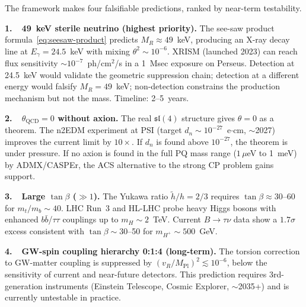 \documentclass[11pt,a4paper]{article}
\theoremstyle{plain}
\theoremstyle{definition}
\theoremstyle{remark}
\begin{document}
The framework makes four falsifiable predictions, ranked by near-term
testability.

\textbf{1.\ \ 49~keV sterile neutrino (highest priority).}
The see-saw product formula~\eqref{eq:seesaw-product} predicts
$M_R \approx 49$~keV, producing an X-ray decay line at $E_\gamma = 24.5$~keV
with mixing $\theta^2 \sim 10^{-6}$.
XRISM (launched 2023) can reach flux sensitivity $\sim 10^{-7}$~ph/cm$^2$/s
in a 1~Msec exposure on Perseus.
Detection at 24.5~keV would validate the geometric suppression chain;
detection at a different energy would falsify $M_R = 49$~keV;
non-detection constrains the production mechanism but not the mass.
Timeline: 2--5~years.

\textbf{2.\ \ $\theta_{\mathrm{QCD}} = 0$ without axion.}
The real $\mathfrak{sl}(4)$ structure gives $\theta = 0$ as a theorem.
The n2EDM experiment at PSI (target $d_n \sim 10^{-27}$~e$\cdot$cm, $\sim$2027)
improves the current limit by $10\times$.  If $d_n$ is found above
$10^{-27}$, the theorem is under pressure.  If no axion is found in the
full PQ mass range ($1\,\mu$eV to 1~meV) by ADMX/CASPEr, the ACS
alternative to the strong CP problem gains support.

\textbf{3.\ \ Large $\tan\beta$ ($\gg 1$).}
The Yukawa ratio $\tilde{h}/h = 2/3$ requires $\tan\beta \approx 30$--$60$
for $m_t/m_b \sim 40$.  LHC Run~3 and HL-LHC probe heavy Higgs bosons with
enhanced $b\bar{b}$/$\tau\tau$ couplings up to $m_H \sim 2$~TeV.
Current $B \to \tau\nu$ data show a $1.7\sigma$ excess consistent with
$\tan\beta \sim 30$--50 for $m_{H^+} \sim 500$~GeV.

\textbf{4.\ \ GW-spin coupling hierarchy 0:1:4 (long-term).}
The torsion correction to GW-matter coupling is suppressed by
$(v_R/M_{\mathrm{Pl}})^2 \lesssim 10^{-6}$, below the sensitivity of
current and near-future detectors.  This prediction requires
3rd-generation instruments (Einstein Telescope, Cosmic Explorer, $\sim$2035+)
and is currently untestable in practice.
\end{document}
